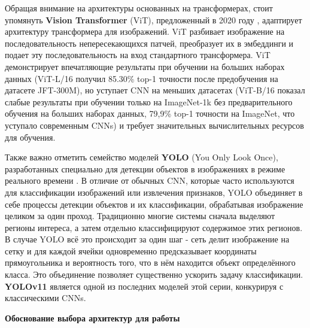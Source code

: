 \documentclass[14pt]{extarticle}
\begin{document}
Обращая внимание на архитектуры основанных на трансформерах, стоит упомянуть \textbf{Vision Transformer} (ViT), предложенный в 2020 году \cite{dosovitskiy2020image}, адаптирует архитектуру трансформера для изображений. ViT разбивает изображение на последовательность непересекающихся патчей, преобразует их в эмбеддинги и подает эту последовательность на вход стандартного трансформера. ViT демонстрирует впечатляющие результаты при обучении на больших наборах данных (ViT-L/16 получил 85.30\% top-1 точности после предобучения на датасете JFT-300M), но уступает CNN на меньших датасетах (ViT-B/16 показал слабые результаты при обучении только на ImageNet-1k без предварительного обучения на больших наборах данных, 79,9\% top-1 точности на ImageNet, что уступало современным CNNs) и требует значительных вычислительных ресурсов для обучения.

Также важно отметить семейство моделей \textbf{YOLO} (You Only Look Once), разработанных специально для детекции объектов в изображениях в режиме реального времени \cite{redmon2015you}. В отличие от обычных CNN, которые часто используются для классификации изображений или извлечения признаков, YOLO объединяет в себе процессы детекции объектов и их классификации, обрабатывая изображение целиком за один проход. Традиционно многие системы сначала выделяют регионы интереса, а затем отдельно классифицируют содержимое этих регионов. В случае YOLO всё это происходит за один шаг - сеть делит изображение на сетку и для каждой ячейки одновременно предсказывает координаты прямоугольника и вероятность того, что в нём находится объект определённого класса. Это объединение позволяет существенно ускорить задачу классификации. \textbf{YOLOv11} \cite{Khanam2024yolov11} является одной из последних моделей этой серии, конкурируя с классическими CNNs.

\textbf{Обоснование выбора архитектур для работы}
\end{document}
